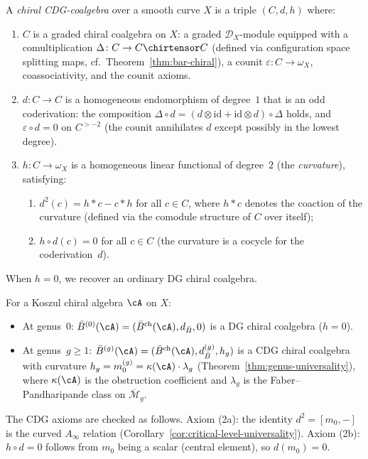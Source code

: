 \begin{definition}\label{def:chiral-CDG-coalgebra}
A \emph{chiral CDG-coalgebra} over a smooth curve $X$ is a triple
$(C, d, h)$ where:
\begin{enumerate}
\item $C$ is a graded chiral coalgebra on $X$: a graded
 $\mathcal{D}_X$-module equipped with a comultiplication
 $\Delta\colon C \to C \chirtensor C$
 (defined via configuration space splitting maps,
 cf.\ Theorem~\ref{thm:bar-chiral}),
 a counit $\varepsilon\colon C \to \omega_X$, coassociativity,
 and the counit axioms.
\item $d\colon C \to C$ is a homogeneous endomorphism of degree~$1$
 that is an odd coderivation: the composition
 $\Delta \circ d = (d \otimes \mathrm{id} +
 \mathrm{id} \otimes d) \circ \Delta$
 holds, and $\varepsilon \circ d = 0$ on $C^{>-2}$
 (the counit annihilates $d$ except possibly in the lowest degree).
\item $h\colon C \to \omega_X$ is a homogeneous linear functional
 of degree~$2$ (the \emph{curvature}), satisfying:
 \begin{enumerate}
 \item $d^2(c) = h \ast c - c \ast h$ for all $c \in C$,
 where $h \ast c$ denotes the coaction of the curvature
 (defined via the comodule structure of $C$ over itself);
 \item $h \circ d(c) = 0$ for all $c \in C$
 (the curvature is a cocycle for the coderivation~$d$).
 \end{enumerate}
\end{enumerate}
When $h = 0$, we recover an ordinary DG chiral coalgebra.
\end{definition}

\begin{example}
\label{ex:bar-as-CDG}
For a Koszul chiral algebra $\cA$ on $X$:
\begin{itemize}
\item At genus~$0$: $\bar{B}^{(0)}(\cA) = (\bar{B}^{\mathrm{ch}}(\cA), d_{\bar{B}}, 0)$
 is a DG chiral coalgebra ($h = 0$).
\item At genus~$g \geq 1$: $\bar{B}^{(g)}(\cA) = (\bar{B}^{\mathrm{ch}}(\cA), d_{\bar{B}}^{(g)}, h_g)$
 is a CDG chiral coalgebra with curvature
 $h_g = m_0^{(g)} = \kappa(\cA) \cdot \lambda_g$
 (Theorem~\ref{thm:genus-universality}), where $\kappa(\cA)$ is
 the obstruction coefficient and $\lambda_g$ is the Faber--Pandharipande
 class on $\overline{\mathcal{M}}_g$.
\end{itemize}
The CDG axioms are checked as follows. Axiom (2a): the identity
$d^2 = [m_0, -]$ is the curved $A_\infty$ relation
(Corollary~\ref{cor:critical-level-universality}).
Axiom (2b): $h \circ d = 0$ follows from $m_0$ being a scalar
(central element), so $d(m_0) = 0$.
\end{example}

